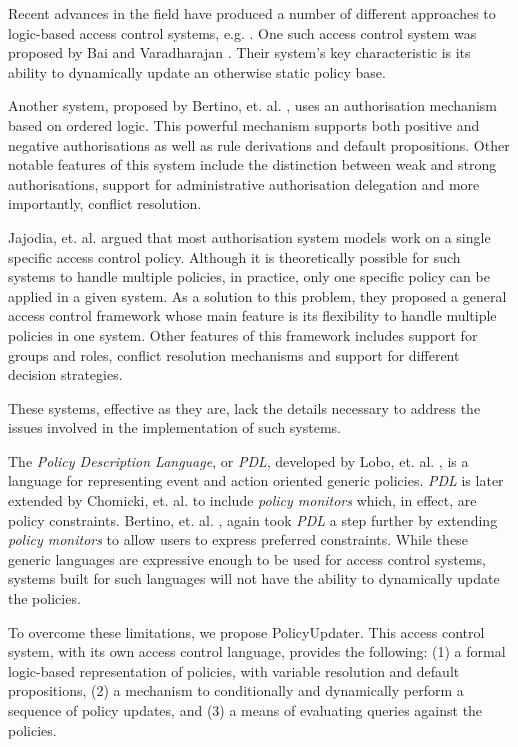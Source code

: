 \documentclass[glov2,twocolumn,final]{svjour2}
\begin{document}
    Recent advances in the field have produced a number of different approaches
    to logic-based access control systems, e.g. \cite{HAL,LI}. One such
    access control system was proposed by Bai and Varadharajan \cite{BA1,BA2}.
    Their system's key characteristic is its ability to dynamically update an
    otherwise static policy base.

    Another system, proposed by Bertino, et. al. \cite{BE1}, uses an
    authorisation mechanism based on ordered logic. This powerful mechanism
    supports both positive and negative authorisations as well as rule
    derivations and default propositions. Other notable features of this system
    include the distinction between weak and strong authorisations, support
    for administrative authorisation delegation and more importantly, conflict
    resolution.

    Jajodia, et. al. \cite{JAJ} argued that most authorisation system models
    work on a single specific access control policy. Although it is
    theoretically possible for such systems to handle multiple policies, in
    practice, only one specific policy can be applied in a given system. As
    a solution to this problem, they proposed a general access control
    framework whose main feature is its flexibility to handle multiple
    policies in one system. Other features of this framework includes support
    for groups and roles, conflict resolution mechanisms and support for
    different decision strategies.

    These systems, effective as they are, lack the details necessary to address
    the issues involved in the implementation of such systems.

    The {\em Policy Description Language}, or {\em PDL}, developed by Lobo,
    et. al. \cite{LOB}, is a language for representing event and action
    oriented generic policies. {\em PDL} is later extended by Chomicki, et. al.
    \cite{CHO} to include {\em policy monitors} which, in effect, are policy
    constraints. Bertino, et. al. \cite{BE2}, again took {\em PDL} a step
    further by extending {\em policy monitors} to allow users to express
    preferred constraints. While these generic languages are expressive enough
    to be used for access control systems, systems built for such languages
    will not have the ability to dynamically update the policies.

    To overcome these limitations, we propose PolicyUpdater. This access
    control system, with its own access control language, provides the
    following: (1) a formal logic-based representation of policies, with
    variable resolution and default propositions, (2) a mechanism to
    conditionally and dynamically perform a sequence of policy updates, and (3)
    a means of evaluating queries against the policies.
\end{document}
